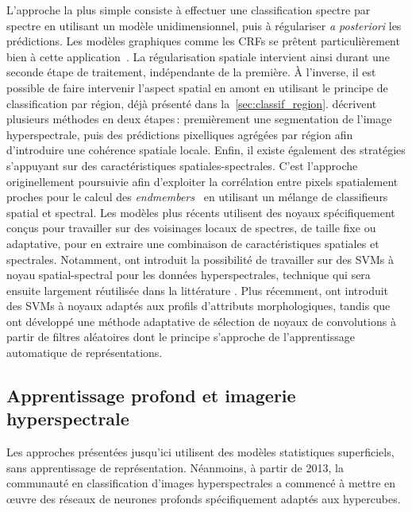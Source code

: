 L'approche la plus simple consiste à effectuer une classification spectre par spectre en utilisant un modèle unidimensionnel, puis à régulariser \emph{a posteriori} les prédictions. Les modèles graphiques comme les \glspl{CRF} se prêtent particulièrement bien à cette application~\cite{wu_semi-supervised_2016}. La régularisation spatiale intervient ainsi durant une seconde étape de traitement, indépendante de la première.
À l'inverse, il est possible de faire intervenir l'aspect spatial en amont en utilisant le principe de classification par région, déjà présenté dans la~\cref{sec:classif_region}. \citet{tarabalka_segmentation_2010,fauvel_advances_2013} décrivent plusieurs méthodes en deux étapes\,: premièrement une segmentation de l'image hyperspectrale, puis des prédictions pixelliques agrégées par région afin d'introduire une cohérence spatiale locale.
Enfin, il existe également des stratégies s'appuyant sur des caractéristiques spatiales-spectrales. C'est l'approche originellement poursuivie afin d'exploiter la corrélation entre pixels spatialement proches pour le calcul des \textit{endmembers}~\cite{plaza_spatial/spectral_2002,dellacqua_exploiting_2004} en utilisant un mélange de classifieurs spatial et spectral. Les modèles plus récents utilisent des noyaux spécifiquement conçus pour travailler sur des voisinages locaux de spectres, de taille fixe ou adaptative, pour en extraire une combinaison de caractéristiques spatiales et spectrales. Notamment, \citet{camps-valls_composite_2006} ont introduit la possibilité de travailler sur des \glspl{SVM} à noyau spatial-spectral pour les données hyperspectrales, technique qui sera ensuite largement réutilisée dans la littérature \cite{tarabalka_spectralspatial_2009,fauvel_spatial-spectral_2012}. Plus récemment, \citet{cui_scalable_2017} ont introduit des \glspl{SVM} à noyaux adaptés aux profils d'attributs morphologiques, tandis que~\citet{tuia_multiclass_2015} ont développé une méthode adaptative de sélection de noyaux de convolutions à partir de filtres aléatoires dont le principe s'approche de l'apprentissage automatique de représentations.

\subsection{Apprentissage profond et imagerie hyperspectrale}
\label{sec:deep_hsi}

Les approches présentées jusqu'ici utilisent des modèles statistiques superficiels, sans apprentissage de représentation. Néanmoins, à partir de 2013, la communauté en classification d'images hyperspectrales a commencé à mettre en \oe{}uvre des réseaux de neurones profonds spécifiquement adaptés aux hypercubes.

